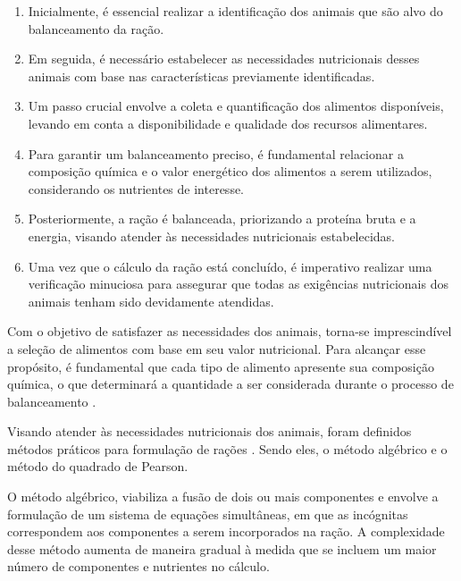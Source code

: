\begin{enumerate}
  \item Inicialmente, é essencial realizar a identificação dos animais que são alvo do balanceamento da ração.

  \item Em seguida, é necessário estabelecer as necessidades nutricionais desses animais com base nas características previamente identificadas.

  \item Um passo crucial envolve a coleta e quantificação dos alimentos disponíveis, levando em conta a disponibilidade e qualidade dos recursos alimentares.

  \item Para garantir um balanceamento preciso, é fundamental relacionar a composição química e o valor energético dos alimentos a serem utilizados, considerando os nutrientes de interesse.

  \item Posteriormente, a ração é balanceada, priorizando a proteína bruta e a energia, visando atender às necessidades nutricionais estabelecidas.

  \item Uma vez que o cálculo da ração está concluído, é imperativo realizar uma verificação minuciosa para assegurar que todas as exigências nutricionais dos animais tenham sido devidamente atendidas.
\end{enumerate}

Com o objetivo de satisfazer as necessidades dos animais, torna-se imprescindível a seleção de alimentos com base em seu valor nutricional. Para alcançar esse propósito, é fundamental que cada tipo de alimento apresente sua composição química, o que determinará a quantidade a ser considerada durante o processo de balanceamento \cite{Tomich:2015:NutricaoPrecisaoPecuariaLeiteira}.

Visando atender às necessidades nutricionais dos animais, foram definidos métodos práticos para formulação de rações \cite{Salman2020:ManualFormulacaoRacaoVacasLeiteiras}. Sendo eles, o método algébrico e o método do quadrado de Pearson.

O método algébrico, viabiliza a fusão de dois ou mais componentes e envolve a formulação de um sistema de equações simultâneas, em que as incógnitas correspondem aos componentes a serem incorporados na ração. A complexidade desse método aumenta de maneira gradual à medida que se incluem um maior número de componentes e nutrientes no cálculo.

